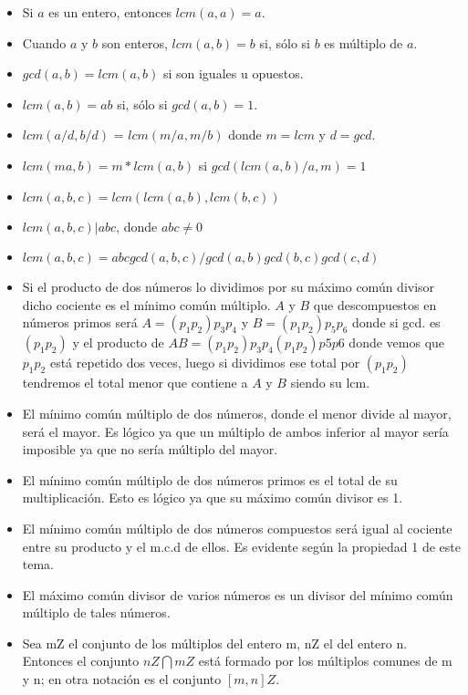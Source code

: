 \begin{itemize}
	
	\item Si $a$ es un entero, entonces $lcm(a,a)=a$.
	
	\item Cuando $a$ y $b$ son enteros, $lcm(a,b)=b$ si, sólo si $b$ es múltiplo de $a$.
	
	\item $gcd(a,b) = lcm(a,b)$ si son iguales u opuestos.
	
	\item $lcm(a,b) =ab$ si, sólo si $gcd(a,b)=1$.
	
	\item $lcm(a/d, b/d)$ = $lcm(m/a, m/b)$ donde $m=lcm$ y $d=gcd$.
	
	\item $lcm(ma,b)= m*lcm(a,b)$ si $gcd(lcm(a,b)/a,m) = 1$
	
	\item $lcm(a,b,c)= lcm(lcm(a,b), lcm(b,c))$
	
	\item $lcm(a, b, c)|abc$, donde $abc \neq 0$
	
	\item $lcm(a,b,c) = abc gcd(a,b,c)/gcd(a,b)gcd(b,c)gcd(c,d)$
	
	\item Si el producto de dos números lo dividimos por su máximo común divisor dicho cociente es el mínimo común múltiplo. $A$ y $B$ que descompuestos en números primos será $A=(p_{1}p_{2})p_{3}p_{4}$ y $B=(p_{1}p_{2})p_{5}p_{6}$ donde si gcd. es $(p_{1}p_{2})$ y el producto de $AB=(p_{1}p_{2})p_{3}p_{4}(p_{1}p_{2})p5p6$ donde vemos que $p_{1}p_{2}$ está repetido dos veces, luego si dividimos ese total por $(p_{1}p_{2})$ tendremos el total menor que contiene a $A$ y $B$ siendo su lcm.
	
	\item El mínimo común múltiplo de dos números, donde el menor divide al mayor, será el mayor. Es lógico ya que un múltiplo de ambos inferior al mayor sería imposible ya que no sería múltiplo del mayor.
	
	\item El mínimo común múltiplo de dos números primos es el total de su multiplicación. Esto es lógico ya que su máximo común divisor es 1.
	
	\item El mínimo común múltiplo de dos números compuestos será igual al cociente entre su producto y el m.c.d de ellos. Es evidente según la propiedad 1 de este tema.
	
	\item El máximo común divisor de varios números es un divisor del mínimo común múltiplo de tales números.
	
	\item Sea mZ el conjunto de los múltiplos del entero m, nZ el del entero n. Entonces el conjunto $nZ \bigcap mZ$ está formado por los múltiplos comunes de m y n; en otra notación es el conjunto $[m,n]Z$.
\end{itemize}










